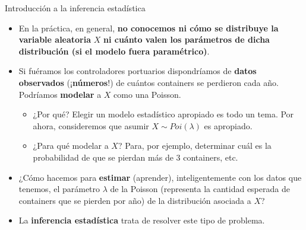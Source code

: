 \documentclass{beamer}
\theoremstyle{definition}
\begin{document}
\begin{frame}{\color{rosee}Introducci\'on a la inferencia estadística}
\small
\begin{itemize}
\item \small{En la práctica, en general, \textbf{no conocemos ni cómo se distribuye la variable aleatoria} $X$ \textbf{ni cuánto valen los parámetros de dicha distribución (si el modelo fuera paramétrico)}.}

    \item \small{Si fu\'eramos los controladores portuarios  dispondr\'iamos de
  \textbf{datos observados} (¡\textbf{n\'umeros}!) de cu\'antos containers se perdieron cada año. Podríamos \textbf{modelar} a $X$ como una Poisson.}
  

\begin{itemize}
    \item \small{¿Por qué? Elegir un modelo estadístico apropiado es todo un tema. Por ahora, consideremos que asumir $X\sim Poi(\lambda)$ es apropiado.}
\item \small{¿Para qué modelar a $X$? Para, por ejemplo, determinar cuál es la probabilidad de que se pierdan más de 3 containers, etc.}
\end{itemize}
  

  \item \small{¿C\'omo hacemos para \textbf{estimar} (aprender), inteligentemente con los datos
  que tenemos, el par\'ametro $\lambda$ de la Poisson (representa la cantidad esperada de containers que se pierden por año) de la distribución asociada a $X$?}

  \item La
  \textbf{inferencia estad\'istica} trata de resolver este tipo de problema.
  \end{itemize}
\end{frame}
\end{document}
